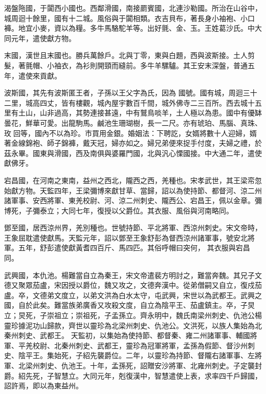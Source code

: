 \begin{pinyinscope}
 渴盤陁國，于闐西小國也。西鄰滑國，南接罽賓國，北連沙勒國。所治在山谷中，城周迴十餘里，國有十二城。風俗與于闐相類。衣吉貝布，著長身小袖袍、小口褲。地宜小麥，資以為糧。多牛馬駱駝羊等。出好氈、金、玉。王姓葛沙氏。中大同元年，遣使獻方物。



 末國，漢世且末國也。勝兵萬餘戶。北與丁零，東與白題，西與波斯接。土人剪髮，著氈帽、小袖衣，為衫則開頸而縫前。多牛羊騾驢。其王安末深盤，普通五年，遣使來貢獻。



 波斯國，其先有波斯匿王者，子孫以王父字為氏，因為
 國號。國有城，周迴三十二里，城高四丈，皆有樓觀，城內屋宇數百千間，城外佛寺二三百所。西去城十五里有土山，山非過高，其勢連接甚遠，中有鷲鳥啖羊，土人極以為患。國中有優缽曇花，鮮華可愛。出龍駒馬。鹹池生珊瑚樹，長一二尺。亦有琥珀、馬腦、真珠、玫回等，國內不以為珍。市買用金銀。婚姻法：下聘訖，女婿將數十人迎婦，婿著金線錦袍、師子錦褲，戴天冠，婦亦如之。婦兄弟便來捉手付度，夫婦之禮，於茲永畢。國東與滑國，西及南俱與婆羅門國，北與汎心慄國接。中大通二年，遣使獻佛牙。



 宕昌國，在河南之東南，益州之西北，隴西之西，羌種也。宋孝武世，其王梁帟忽始獻方物。天監四年，王梁彌博來獻甘草、當歸，詔以為使持節、都督河、涼二州諸軍事、安西將軍、東羌校尉、河、涼二州刺史、隴西公、宕昌王，佩以金章。彌博死，子彌泰立；大同七年，復授以父爵位。其衣服、風俗與河南略同。



 鄧至國，居西涼州界，羌別種也。世號持節、平北將軍、西涼州刺史。宋文帝時，王象屈耽遣使獻馬。天監元年，詔以鄧至王象舒彭為督西涼州諸軍事，號安北將軍。五年，舒彭遣使獻黃耆四百斤、馬四匹。其俗呼帽曰突何，
 其衣服與宕昌同。



 武興國，本仇池。楊難當自立為秦王，宋文帝遣裴方明討之，難當奔魏。其兄子文德又聚眾茄盧，宋因授以爵位，魏又攻之，文德奔漢中。從弟僧嗣又自立，復戍茄盧。卒，文德弟文度立，以弟文洪為白水太守，屯武興，宋世以為武都王。武興之國，自於此矣。難當族弟廣香又攻殺文度，自立為陰平王、茄盧鎮主。卒，子炅立；炅死，子崇祖立；崇祖死，子孟孫立。齊永明中，魏氏南梁州刺史、仇池公楊靈珍據泥功山歸款，齊世以靈珍為北梁州刺史、仇池公。文洪死，以族人集始為北秦州刺史、武都王。
 天監初，以集始為使持節、都督秦、雍二州諸軍事、輔國將軍、平羌校尉、北秦州刺史、武都王，靈珍為冠軍將軍，孟孫為假節、督沙州刺史、陰平王。集始死，子紹先襲爵位。二年，以靈珍為持節、督隴右諸軍事、左將軍、北梁州刺史、仇池王。十年，孟孫死，詔贈安沙將軍、北雍州刺史。子定襲封爵。紹先死，子智慧立。大同元年，剋復漢中，智慧遣使上表，求率四千戶歸國，詔許焉，即以為東益州。




\end{pinyinscope}

